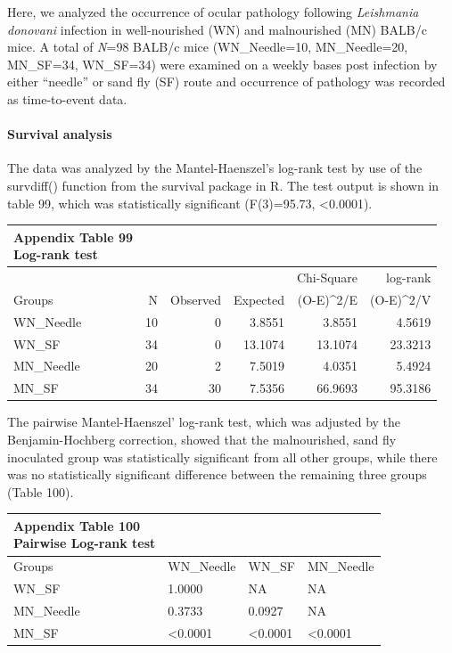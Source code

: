 \documentclass[
  12pt,
  letterpaper,
]{article}
\begin{document}
Here, we analyzed the occurrence of ocular pathology following \emph{Leishmania donovani} infection in well-nourished (WN) and malnourished (MN) BALB/c mice. A total of \emph{N}=98 BALB/c mice (WN\_Needle=10, MN\_Needle=20, MN\_SF=34, WN\_SF=34) were examined on a weekly bases post infection by either ``needle'' or sand fly (SF) route and occurrence of pathology was recorded as time-to-event data.

\paragraph{Survival analysis}\label{survival-analysis}

The data was analyzed by the Mantel-Haenszel's log-rank test by use of the survdiff() function from the survival package in R. The test output is shown in table 99, which was statistically significant (F(3)=95.73, \textless0.0001).

\begin{longtable}{l|rrrrr}
\caption*{
{\large \textbf{Appendix Table 99}} \\ 
{\small \textbf{Log-rank test}}
} \\ 
\toprule
\multicolumn{1}{l}{} &  &  &  & Chi-Square & log-rank \\ 
\cmidrule(lr){5-5} \cmidrule(lr){6-6}
\multicolumn{1}{l}{Groups} & N & Observed & Expected & (O-E)\textasciicircum{}2/E & (O-E)\textasciicircum{}2/V \\ 
\midrule\addlinespace[2.5pt]
WN\_Needle & 10 & 0 & 3.8551 & 3.8551 & 4.5619 \\ 
WN\_SF & 34 & 0 & 13.1074 & 13.1074 & 23.3213 \\ 
MN\_Needle & 20 & 2 & 7.5019 & 4.0351 & 5.4924 \\ 
MN\_SF & 34 & 30 & 7.5356 & 66.9693 & 95.3186 \\ 
\bottomrule
\end{longtable}

The pairwise Mantel-Haenszel' log-rank test, which was adjusted by the Benjamin-Hochberg correction, showed that the malnourished, sand fly inoculated group was statistically significant from all other groups, while there was no statistically significant difference between the remaining three groups (Table 100).

\begin{longtable}{l|lll}
\caption*{
{\large \textbf{Appendix Table 100}} \\ 
{\small \textbf{Pairwise Log-rank test}}
} \\ 
\toprule
\multicolumn{1}{l}{Groups} & WN\_Needle & WN\_SF & MN\_Needle \\ 
\midrule\addlinespace[2.5pt]
WN\_SF & 1.0000 & NA & NA \\ 
MN\_Needle & 0.3733 & 0.0927 & NA \\ 
MN\_SF & <0.0001 & <0.0001 & <0.0001 \\ 
\bottomrule
\end{longtable}
\end{document}
